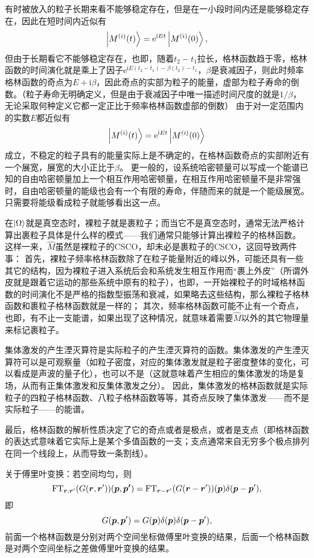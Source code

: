 \documentclass[hyperref, UTF8, a4paper]{ctexart}
\newcommand*{\ii}{\mathrm{i}}
\newcommand*{\ee}{\mathrm{e}}
\begin{document}
有时被放入的粒子长期来看不能够稳定存在，但是在一小段时间内还是能够稳定存在，因此在短时间内近似有
\[
    \ket{M^{(i)}(t)} = \ee^{\ii E t} \ket{M^{(i)}(0)},
\]
但由于长期看它不能够稳定存在，也即，随着$t_2-t_1$拉长，格林函数趋于零，格林函数的时间演化就是乘上了因子$\ee^{\ii E (t_2 - t_1) - \beta (t_2) - t_1}$，$\beta$是衰减因子，则此时频率格林函数的奇点为$E + \ii \beta$，因此奇点的实部为粒子的能量，虚部为粒子寿命的倒数。（粒子寿命无明确定义，但是由于衰减因子中唯一描述时间尺度的就是$1/\beta$，无论采取何种定义它都一定正比于频率格林函数虚部的倒数）
由于对一定范围内的实数$E$都近似有
\[
    \ket{M^{(i)}(t)} = \ee^{\ii E t} \ket{M^{(i)}(0)}
\]
成立，不稳定的粒子具有的能量实际上是不确定的，在格林函数奇点的实部附近有一个展宽，展宽的大小正比于$\beta$。
更一般的，设系统哈密顿量可以写成一个能谱已知的自由哈密顿量加上一个相互作用哈密顿量，在相互作用哈密顿量不是非常强时，自由哈密顿量的能级也会有一个有限的寿命，伴随而来的就是一个能级展宽。只需要将能级看成粒子就能够看出这一点。

在$\ket{\Omega}$就是真空态时，裸粒子就是裹粒子；而当它不是真空态时，通常无法严格计算出裹粒子具体是什么样的模式——我们通常只能够计算出裸粒子的格林函数。
这样一来，$\hat{M}$虽然是裸粒子的CSCO，却未必是裹粒子的CSCO，这回导致两件事：
首先，裸粒子频率格林函数除了在粒子能量附近的峰以外，可能还具有一些其它的结构，因为裸粒子进入系统后会和系统发生相互作用而“裹上外皮”（所谓外皮就是跟着它运动的那些系统中原有的粒子），也即，一开始裸粒子的时域格林函数的时间演化不是严格的指数型振荡和衰减，如果略去这些结构，那么裸粒子格林函数和裹粒子格林函数就是一样的；
其次，频率格林函数可能不止有一个奇点，也即，有不止一支能谱，如果出现了这种情况，就意味着需要$\hat{M}$以外的其它物理量来标记裹粒子。

集体激发的产生湮灭算符是实际粒子的产生湮灭算符的函数。集体激发的产生湮灭算符可以是可观察量（如粒子密度，对应的集体激发就是粒子密度整体的变化，可以看成是声波的量子化），也可以不是（这就意味着产生相应的集体激发的场是复场，从而有正集体激发和反集体激发之分）。
因此，集体激发的格林函数就是实际粒子的四粒子格林函数、八粒子格林函数等等，其奇点反映了集体激发——而不是实际粒子——的能谱。

最后，格林函数的解析性质决定了它的奇点或者是极点，或者是支点（即格林函数的表达式意味着它实际上是某个多值函数的一支；支点通常来自无穷多个极点排列在同一个线段上，从而导致一条割线）。

关于傅里叶变换：若空间均匀，则
\[
    \text{FT}_{\vb*{r}, \vb*{r}'}(G(\vb*{r}, \vb*{r}'))(\vb*{p}, \vb*{p'}) = \text{FT}_{\vb*{r}-\vb*{r}'} (G(\vb*{r}-\vb*{r}')) (\vb*{p}) \delta(\vb*{p}-\vb*{p}') ,
\]
即
\[
    G(\vb*{p}, \vb*{p}') = G(\vb*{p}) \delta(\vb*{p}) \delta(\vb*{p} - \vb*{p}'),
\]
前面一个格林函数是分别对两个空间坐标做傅里叶变换的结果，后面一个格林函数是对两个空间坐标之差做傅里叶变换的结果。
\end{document}

